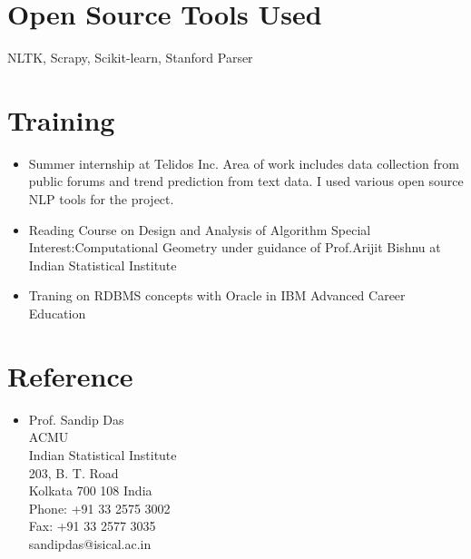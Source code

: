 \documentclass{res}
\begin{document}
\begin{resume}
\section{\bf Open Source Tools Used}
NLTK, Scrapy, Scikit-learn, Stanford Parser


\section{Training}
   \begin{itemize}

\item Summer internship at Telidos Inc. Area of work includes data collection from public forums
and trend prediction from text data. I used various open source NLP tools for the project.

\item     Reading Course on Design and Analysis of Algorithm 
    Special Interest:Computational Geometry 
    under guidance of Prof.Arijit Bishnu at
    Indian Statistical Institute 

\item    Traning on RDBMS concepts with Oracle in
    IBM Advanced Career Education \\    
\end{itemize}     



\section{Reference}

\begin{itemize}
\item Prof. Sandip Das\\
ACMU \\
Indian Statistical Institute\\
203, B. T. Road \\
Kolkata 700 108 India \\
Phone: +91 33 2575 3002 \\
Fax: +91 33 2577 3035 \\
sandipdas@isical.ac.in\\



\end{itemize}
\end{resume}
\end{document}
